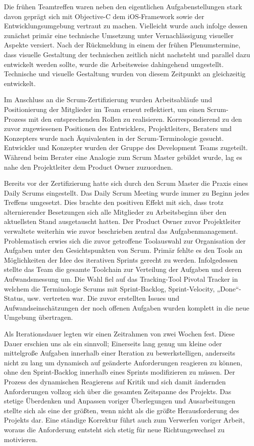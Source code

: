 	Die frühen Teamtreffen waren neben den eigentlichen Aufgabenstellungen stark davon geprägt sich mit Objective-C dem iOS-Framework sowie der Entwicklungsumgebung vertraut zu machen. Vielleicht wurde auch infolge dessen zunächst primär eine technische Umsetzung unter Vernachlässigung visueller Aspekte versiert. Nach der Rückmeldung in einem der frühen Plenumstermine, dass visuelle Gestaltung der technischen zeitlich nicht nachsteht und parallel dazu entwickelt werden sollte, wurde die Arbeitsweise dahingehend umgestellt. Technische und visuelle Gestaltung wurden von diesem Zeitpunkt an gleichzeitig entwickelt. 

	Im Anschluss an die Scrum-Zertifizierung wurden Arbeitsabläufe und Positionierung der Mitglieder im Team erneut reflektiert, um einen Scrum-Prozess mit den entsprechenden Rollen zu realisieren. Korrespondierend zu den zuvor zugewiesenen Positionen des Entwicklers, Projektleiters, Beraters und Konzepters wurde nach Äquivalenten in der Scrum-Terminologie gesucht. Entwickler und Konzepter wurden der Gruppe des Development Teams zugeteilt. Während beim Berater eine Analogie zum Scrum Master gebildet wurde, lag es nahe den Projektleiter dem Product Owner zuzuordnen. 

	Bereits vor der Zertifizierung hatte sich durch den Scrum Master die Praxis eines Daily Scrums eingestellt. Das Daily Scrum Meeting wurde immer zu Beginn jedes Treffens umgesetzt. Dies brachte den positiven Effekt mit sich, dass trotz alternierender Besetzungen sich alle Mitglieder zu Arbeitsbeginn über den aktuellsten Stand ausgetauscht hatten. Der Product Owner zuvor Projektleiter verwaltete weiterhin wie zuvor beschrieben zentral das Aufgabenmanagement. 
Problematisch erwies sich die zuvor getroffene Toolauswahl zur Organisation der Aufgaben unter den Gesichtspunkten von Scrum. Primär fehlte es den Tools an Möglichkeiten der Idee des iterativen Sprints gerecht zu werden. Infolgedessen stellte das Team die gesamte Toolchain zur Verteilung der Aufgaben und deren Aufwandsmessung um. Die Wahl fiel auf das Tracking-Tool Pivotal Tracker in welchem die Terminologie Scrums mit Sprint-Backlog, Sprint-Velocity, „Done“- Status, usw. vertreten war. Die zuvor erstellten Issues und Aufwandseinschätzungen der noch offenen Aufgaben wurden komplett in die neue Umgebung übertragen.

	Als Iterationsdauer legten wir einen Zeitrahmen von zwei Wochen fest. Diese Dauer erschien uns als ein sinnvoll; Einerseits lang genug um kleine oder mittelgroße Aufgaben innerhalb einer Iteration zu bewerkstelligen, anderseits nicht zu lang um dynamisch auf geänderte Anforderungen reagieren zu können, ohne den Sprint-Backlog innerhalb eines Sprints modifizieren zu müssen. Der Prozess des dynamischen Reagierens auf Kritik und sich damit ändernden Anforderungen vollzog sich über die gesamten Zeitspanne des Projekts. Das stetige Überdenken und Anpassen voriger Überlegungen und Ausarbeitungen stellte sich als eine der größten, wenn nicht als die größte Herausforderung des Projekts dar. Eine ständige Korrektur führt auch zum Verwerfen voriger Arbeit, woraus die Anforderung entsteht sich stetig für neue Richtungswechsel zu motivieren.  

